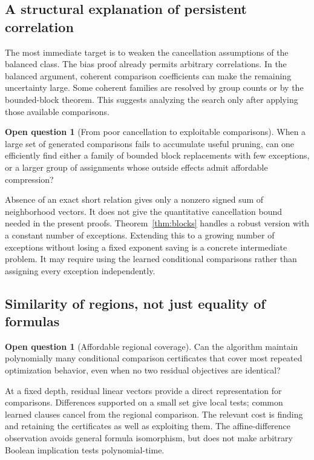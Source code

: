 \documentclass[11pt,a4paper]{article}
\theoremstyle{definition}
\newtheorem{question}[theorem]{Open question}
\theoremstyle{remark}
\begin{document}
\subsection{A structural explanation of persistent correlation}

The most immediate target is to weaken the cancellation assumptions of the
balanced class. The bias proof already permits arbitrary correlations.
In the balanced argument, coherent comparison coefficients can make the
remaining uncertainty large. Some coherent families are resolved by group
counts or by the bounded-block theorem. This suggests analyzing the search
only after applying those available comparisons.

\begin{question}[From poor cancellation to exploitable comparisons]
When a large set of generated comparisons fails to accumulate useful
pruning, can one efficiently find either a family of bounded block
replacements with few exceptions, or a larger group of assignments whose
outside effects admit affordable compression?
\end{question}

Absence of an exact short relation gives only a nonzero signed sum of
neighborhood vectors. It does not give the quantitative cancellation bound
needed in the present proofs. Theorem~\ref{thm:blocks} handles a robust
version with a constant number of exceptions. Extending this to a growing
number of exceptions without losing a fixed exponent saving is a concrete
intermediate problem. It may require using the learned conditional
comparisons rather than assigning every exception independently.

\subsection{Similarity of regions, not just equality of formulas}

\begin{question}[Affordable regional coverage]
Can the algorithm maintain polynomially many conditional comparison
certificates that cover most repeated optimization behavior, even when no
two residual objectives are identical?
\end{question}

At a fixed depth, residual linear vectors provide a direct representation
for comparisons. Differences supported on a small set give local tests;
common learned clauses cancel from the regional comparison. The relevant
cost is finding and retaining the certificates as well as exploiting them.
The affine-difference observation avoids general formula isomorphism, but
does not make arbitrary Boolean implication tests polynomial-time.
\end{document}
